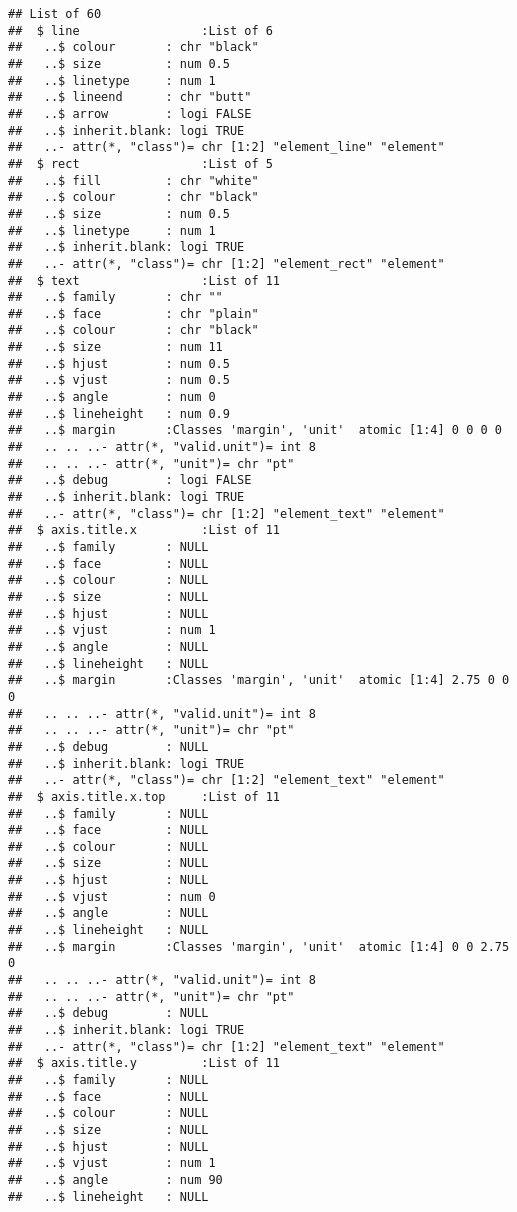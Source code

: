 \documentclass[]{article}
\begin{document}
\begin{verbatim}
## List of 60
##  $ line                 :List of 6
##   ..$ colour       : chr "black"
##   ..$ size         : num 0.5
##   ..$ linetype     : num 1
##   ..$ lineend      : chr "butt"
##   ..$ arrow        : logi FALSE
##   ..$ inherit.blank: logi TRUE
##   ..- attr(*, "class")= chr [1:2] "element_line" "element"
##  $ rect                 :List of 5
##   ..$ fill         : chr "white"
##   ..$ colour       : chr "black"
##   ..$ size         : num 0.5
##   ..$ linetype     : num 1
##   ..$ inherit.blank: logi TRUE
##   ..- attr(*, "class")= chr [1:2] "element_rect" "element"
##  $ text                 :List of 11
##   ..$ family       : chr ""
##   ..$ face         : chr "plain"
##   ..$ colour       : chr "black"
##   ..$ size         : num 11
##   ..$ hjust        : num 0.5
##   ..$ vjust        : num 0.5
##   ..$ angle        : num 0
##   ..$ lineheight   : num 0.9
##   ..$ margin       :Classes 'margin', 'unit'  atomic [1:4] 0 0 0 0
##   .. .. ..- attr(*, "valid.unit")= int 8
##   .. .. ..- attr(*, "unit")= chr "pt"
##   ..$ debug        : logi FALSE
##   ..$ inherit.blank: logi TRUE
##   ..- attr(*, "class")= chr [1:2] "element_text" "element"
##  $ axis.title.x         :List of 11
##   ..$ family       : NULL
##   ..$ face         : NULL
##   ..$ colour       : NULL
##   ..$ size         : NULL
##   ..$ hjust        : NULL
##   ..$ vjust        : num 1
##   ..$ angle        : NULL
##   ..$ lineheight   : NULL
##   ..$ margin       :Classes 'margin', 'unit'  atomic [1:4] 2.75 0 0 0
##   .. .. ..- attr(*, "valid.unit")= int 8
##   .. .. ..- attr(*, "unit")= chr "pt"
##   ..$ debug        : NULL
##   ..$ inherit.blank: logi TRUE
##   ..- attr(*, "class")= chr [1:2] "element_text" "element"
##  $ axis.title.x.top     :List of 11
##   ..$ family       : NULL
##   ..$ face         : NULL
##   ..$ colour       : NULL
##   ..$ size         : NULL
##   ..$ hjust        : NULL
##   ..$ vjust        : num 0
##   ..$ angle        : NULL
##   ..$ lineheight   : NULL
##   ..$ margin       :Classes 'margin', 'unit'  atomic [1:4] 0 0 2.75 0
##   .. .. ..- attr(*, "valid.unit")= int 8
##   .. .. ..- attr(*, "unit")= chr "pt"
##   ..$ debug        : NULL
##   ..$ inherit.blank: logi TRUE
##   ..- attr(*, "class")= chr [1:2] "element_text" "element"
##  $ axis.title.y         :List of 11
##   ..$ family       : NULL
##   ..$ face         : NULL
##   ..$ colour       : NULL
##   ..$ size         : NULL
##   ..$ hjust        : NULL
##   ..$ vjust        : num 1
##   ..$ angle        : num 90
##   ..$ lineheight   : NULL

\end{verbatim}
\end{document}
